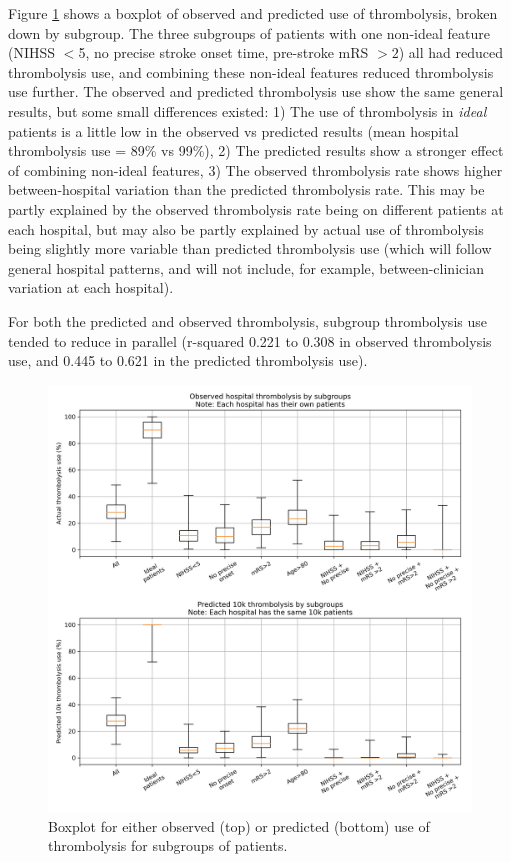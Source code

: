 Figure \ref{fig:results_boxplot} shows a boxplot of observed and predicted use of thrombolysis, broken down by subgroup. The three subgroups of patients with one non-ideal feature (NIHSS $<$5, no precise stroke onset time, pre-stroke mRS $>2$) all had reduced thrombolysis use, and combining these non-ideal features reduced thrombolysis use further. The observed and predicted thrombolysis use show the same general results, but some small differences existed: 1) The use of thrombolysis in \emph{ideal} patients is a little low in the observed vs predicted results (mean hospital thrombolysis use = 89\% vs 99\%), 2) The predicted results show a stronger effect of combining non-ideal features, 3) The observed thrombolysis rate shows higher between-hospital variation than the predicted thrombolysis rate. This may be partly explained by the observed thrombolysis rate being on different patients at each hospital, but may also be partly explained by actual use of thrombolysis being slightly more variable than predicted thrombolysis use (which will follow general hospital patterns, and will not include, for example, between-clinician variation at each hospital).

For both the predicted and observed thrombolysis, subgroup thrombolysis use tended to reduce in parallel (r-squared 0.221 to 0.308 in observed thrombolysis use, and 0.445 to 0.621 in the predicted thrombolysis use). 

\begin{figure}[!h]
\centering
\includegraphics[width=1\textwidth]{./images/15a_actual_vs_modelled_subgroup_violin}
\caption{Boxplot for either observed (top) or predicted (bottom) use of thrombolysis for subgroups of patients.}
\label{fig:results_boxplot}
\end{figure}

